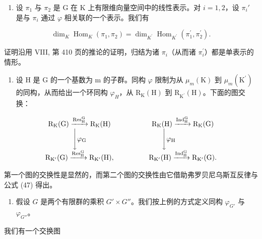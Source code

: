 \begin{enumerate}
\def\labelenumi{\arabic{enumi})}
\setcounter{enumi}{2}
\tightlist
\item
  设 \(\pi_1\) 与 \(\pi_2\) 是 G 在 K 上有限维向量空间中的线性表示。对 \(i = 1,2\)，设 \(\pi_i'\) 是与 \(\pi_i\) 通过 \(\varphi\) 相关联的一个表示。我们有
\end{enumerate}

\[
\dim_ {K} \operatorname{Hom} _ {K} (\pi_ {1}, \pi_ {2}) = \dim_ {K ^ {\prime}} \operatorname{Hom} _ {K ^ {\prime}} (\pi_ {1} ^ {\prime}, \pi_ {2} ^ {\prime}).\tag{47}
\]

证明沿用 VIII, 第 410 页的推论的证明，归结为诸 \(\pi_{i}\)（从而诸 \(\pi_{i}^{\prime}\)）都是单表示的情形。

\begin{enumerate}
\def\labelenumi{\arabic{enumi})}
\setcounter{enumi}{3}
\tightlist
\item
  设 H 是 G 的一个基数为 m 的子群。同构 \(\varphi\) 限制为从 \(\mu_{m}(\mathrm{K})\) 到 \(\mu_{m}(\mathrm{K}^{\prime})\) 的同构，从而给出一个环同构 \(\varphi_{H}\)，从 \(\mathrm{R}_{\mathrm{K}}(\mathrm{H})\) 到 \(\mathrm{R}_{\mathrm{K}^{\prime}}(\mathrm{H})\)。下面的图交换：
\end{enumerate}

\[
\begin{array}{c c} \mathrm {R_ {K} (G)} \xrightarrow {\mathrm {Res_ {H} ^ {G}}} \mathrm {R_ {K} (H)} & \qquad \qquad \mathrm {R_ {K} (H)} \xrightarrow {\mathrm {Ind_ {H} ^ {G}}} \mathrm {R_ {K} (G)} \\ \Biggl \downarrow \varphi_ {\mathrm{G}} & \Biggl \downarrow \varphi_ {\mathrm{H}} \\ \mathrm {R_ {K^ {\prime}} (G)} \xrightarrow {\mathrm {Res_ {H} ^ {G}}} \mathrm {R_ {K^ {\prime}} (H)}, & \qquad \qquad \mathrm {R_ {K^ {\prime}} (H)} \xrightarrow {\mathrm {Ind_ {H} ^ {G}}} \mathrm {R_ {K^ {\prime}} (G)}. \end{array}
\]

第一个图的交换性是显然的，而第二个图的交换性由它借助弗罗贝尼乌斯互反律与公式 (47) 得出。

\begin{enumerate}
\def\labelenumi{\arabic{enumi})}
\setcounter{enumi}{4}
\tightlist
\item
  假设 \(G\) 是两个有限群的乘积 \(G' \times G''\)。我们按上例的方式定义同构 \(\varphi_{G'}\) 与 \(\varphi_{G''}\)。
\end{enumerate}

我们有一个交换图

